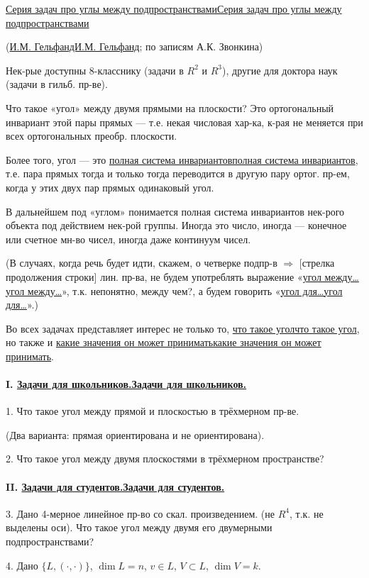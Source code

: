 \documentclass[11pt]{article}
\theoremstyle{definition}
\theoremstyle{remark}
\let\DiplomaticMathUnderline\underline
\renewcommand{\underline}[1]{\ifmmode\DiplomaticMathUnderline{#1}\else\uline{#1}\fi}
\begin{document}
\begin{center}
\underline{Серия задач про углы между подпространствами}

(\underline{И.М. Гельфанд}; по записям А.К. Звонкина)
\end{center}

Нек-рые доступны 8-класснику (задачи в $R^2$ и $R^3$),
другие для доктора наук (задачи в гильб. пр-ве).

Что такое «угол» между двумя прямыми на плоскости?
Это ортогональный инвариант этой пары прямых — т.е. некая
числовая хар-ка, к-рая не меняется при всех ортогональных преобр.
плоскости.

Более того, угол — это \underline{полная система инвариантов}, т.е.
пара прямых тогда и только тогда переводится в другую пару
ортог. пр-ем, когда у этих двух пар прямых одинаковый угол.

В дальнейшем под «углом» понимается полная система
инвариантов нек-рого объекта под действием нек-рой группы.
Иногда это число, иногда — конечное или счетное мн-во чисел,
иногда даже континуум чисел.

(В случаях, когда речь будет идти, скажем, о четверке подпр-в
$\Rightarrow$ [стрелка продолжения строки]
лин. пр-ва, не будем употреблять выражение «\underline{угол между\ldots}»,
т.к. непонятно, между чем?, а будем говорить «\underline{угол для\ldots}».)

Во всех задачах представляет интерес не только то,
\underline{что такое угол}, но также и \underline{какие значения он может
принимать}.

\paragraph*{I. \underline{Задачи для школьников.}}
1. Что такое угол между прямой и плоскостью в трёхмерном
пр-ве.

(Два варианта: прямая ориентирована и не ориентирована).

2. Что такое угол между двумя плоскостями в трёхмерном
пространстве?

\paragraph*{II. \underline{Задачи для студентов.}}
3. Дано 4-мерное линейное пр-во со скал. произведением.
(не $R^4$, т.к. не выделены оси). Что такое угол между двумя его
двумерными подпространствами?

4. Дано $\{L,(\cdot,\cdot)\}$, $\dim L=n$, $v\in L$, $V\subset L$,
$\dim V=k$.
\end{document}
